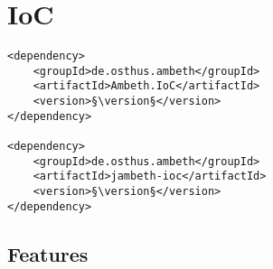 \section{IoC}
\label{module:IoC}
\ClearAPI
\TODO
\begin{lstlisting}[style=POM,caption={Maven modules to use \emph{Ambeth IoC}}]
<dependency>
	<groupId>de.osthus.ambeth</groupId>
	<artifactId>Ambeth.IoC</artifactId>
	<version>§\version§</version>
</dependency>

<dependency>
	<groupId>de.osthus.ambeth</groupId>
	<artifactId>jambeth-ioc</artifactId>
	<version>§\version§</version>
</dependency>
\end{lstlisting}
\subsection{Features}
